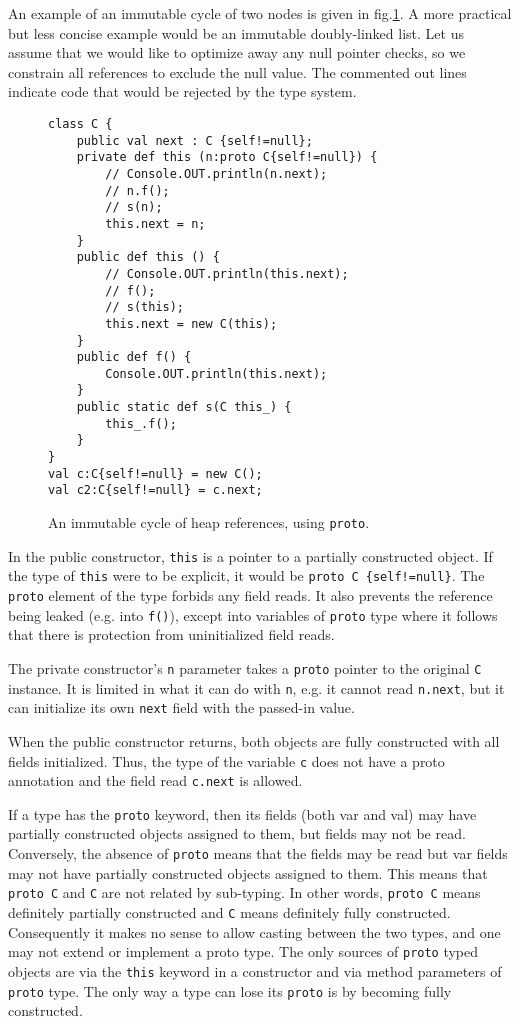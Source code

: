 An example of an immutable cycle of two nodes is given in
fig.\ref{Figure:Cyclic}.  A more practical but less concise example would be an
immutable doubly-linked list.  Let us assume that we would like to optimize
away any null pointer checks, so we constrain all references to exclude the
null value.  The commented out lines indicate code that would be rejected by
the type system.

\begin{figure}
\begin{lstlisting}
class C {
    public val next : C {self!=null};
    private def this (n:proto C{self!=null}) {
        // Console.OUT.println(n.next);
        // n.f();
        // s(n);
        this.next = n;
    }
    public def this () {
        // Console.OUT.println(this.next);
        // f();
        // s(this);
        this.next = new C(this);
    }
    public def f() {
        Console.OUT.println(this.next);
    }
    public static def s(C this_) {
        this_.f();
    }
}
val c:C{self!=null} = new C();
val c2:C{self!=null} = c.next;
\end{lstlisting}
\caption{An immutable cycle of heap references, using \texttt{proto}.}
\label{Figure:Cyclic}
\end{figure}

In the public constructor, \texttt{this} is a pointer to a partially
constructed object.  If the type of \texttt{this} were to be explicit, it would
be \texttt{proto C \{self!=null\}}.  The \texttt{proto} element of the type
forbids any field reads.  It also prevents the reference being leaked (e.g.
into \texttt{f()}), except into variables of \texttt{proto} type where it
follows that there is protection from uninitialized field reads.

The private constructor's \texttt{n} parameter takes a \texttt{proto} pointer
to the original \texttt{C} instance.  It is limited in what it can do with
\texttt{n}, e.g. it cannot read \texttt{n.next}, but it can initialize its own
\texttt{next} field with the passed-in value.

When the public constructor returns, both objects are fully constructed with
all fields initialized.  Thus, the type of the variable \texttt{c} does not
have a proto annotation and the field read \texttt{c.next} is allowed.

If a type has the \texttt{proto} keyword, then its fields (both var and val)
may have partially constructed objects assigned to them, but fields may not be
read.  Conversely, the absence of \texttt{proto} means that the fields may be
read but var fields may not have partially constructed objects assigned to them.
This means that \texttt{proto C} and \texttt{C} are not related by sub-typing.
In other words, \texttt{proto C} means definitely partially constructed and
\texttt{C} means definitely fully constructed.  Consequently it makes no sense
to allow casting between the two types, and one may not extend or implement a
proto type.  The only sources of \texttt{proto} typed objects are via the
\texttt{this} keyword in a constructor and via method parameters of
\texttt{proto} type.  The only way a type can lose its \texttt{proto} is by
becoming fully constructed.

